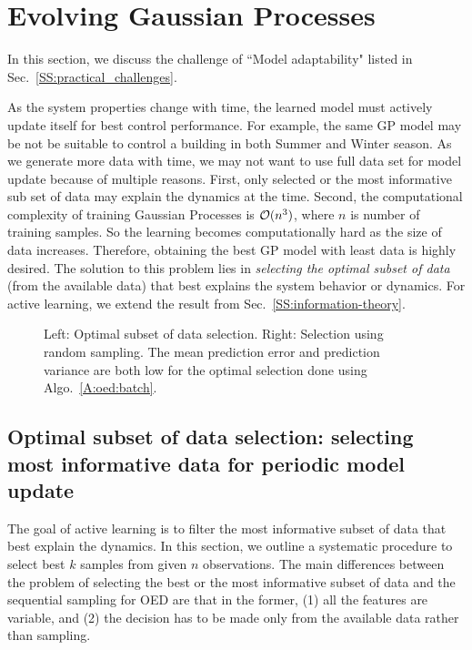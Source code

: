 \section{Evolving Gaussian Processes}
\label{S:active}

In this section, we discuss the challenge of ``Model adaptability" listed in Sec.~\ref{SS:practical_challenges}.

As the system properties change with time, the learned model must actively update itself for best control performance.
For example, the same GP model may be not be suitable to control a building in both Summer and Winter season.
As we generate more data with time, we may not want to use full data set for model update because of multiple reasons.
First, only selected or the most informative sub set of data may explain the dynamics at the time. Second, the computational complexity of training Gaussian Processes is $\mathcal{O}(n^3)$, where $n$ is number of training samples. So the learning becomes computationally hard as the size of data increases.
Therefore, obtaining the best GP model with least data is highly desired. The solution to this problem lies in \textit{selecting the optimal subset of data} (from the available data) that best explains the system behavior or dynamics.
For active learning, we extend the result from Sec.~\ref{SS:information-theory}.

\begin{figure*}[t]
	\centering
	\setlength{} 
	\setlength{}
	 \hspace{0.5cm}
	
	\caption{Left: Optimal subset of data selection. Right: Selection using random sampling. The mean prediction error and prediction variance are both low for the optimal selection done using Algo.~\ref{A:oed:batch}.}
	\captionsetup{justification=centering}
	\label{F:active:example}
\end{figure*}

\subsection{Optimal subset of data selection: selecting most informative data for periodic model update}

The goal of active learning is to filter the most informative subset of data that best explain the dynamics.
In this section, we outline a systematic procedure to select best $k$ samples from given $n$ observations.
The main differences between the problem of selecting the best or the most informative subset of data and the sequential sampling for OED are that in the former, (1) all the features are variable, and (2) the decision has to be made only from the available data rather than sampling. 

